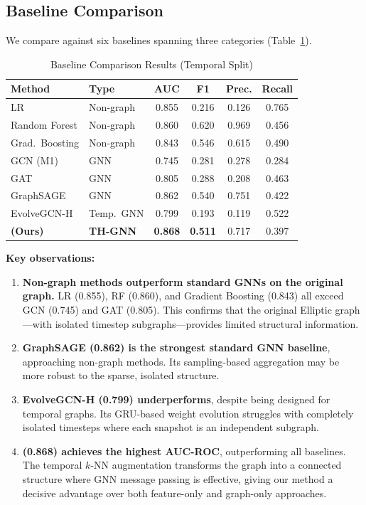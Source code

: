 \subsection{Baseline Comparison}

We compare against six baselines spanning three categories (Table~\ref{tab:baselines}).

\begin{table}[h]
\centering
\caption{Baseline Comparison Results (Temporal Split)}
\label{tab:baselines}
\begin{tabular}{llcccc}
\toprule
\textbf{Method} & \textbf{Type} & \textbf{AUC} & \textbf{F1} & \textbf{Prec.} & \textbf{Recall} \\
\midrule
LR & Non-graph & 0.855 & 0.216 & 0.126 & 0.765 \\
Random Forest & Non-graph & 0.860 & 0.620 & 0.969 & 0.456 \\
Grad.\ Boosting & Non-graph & 0.843 & 0.546 & 0.615 & 0.490 \\
\midrule
GCN (M1) & GNN & 0.745 & 0.281 & 0.278 & 0.284 \\
GAT & GNN & 0.805 & 0.288 & 0.208 & 0.463 \\
GraphSAGE & GNN & 0.862 & 0.540 & 0.751 & 0.422 \\
\midrule
EvolveGCN-H & Temp.\ GNN & 0.799 & 0.193 & 0.119 & 0.522 \\
\midrule
\textbf{\ours{} (Ours)} & \textbf{TH-GNN} & \textbf{0.868} & \textbf{0.511} & 0.717 & 0.397 \\
\bottomrule
\end{tabular}
\end{table}

\textbf{Key observations:}

\begin{enumerate}
    \item \textbf{Non-graph methods outperform standard GNNs on the original graph.} LR (0.855), RF (0.860), and Gradient Boosting (0.843) all exceed GCN (0.745) and GAT (0.805). This confirms that the original Elliptic graph---with isolated timestep subgraphs---provides limited structural information.

    \item \textbf{GraphSAGE (0.862) is the strongest standard GNN baseline}, approaching non-graph methods. Its sampling-based aggregation may be more robust to the sparse, isolated structure.

    \item \textbf{EvolveGCN-H (0.799) underperforms}, despite being designed for temporal graphs. Its GRU-based weight evolution struggles with completely isolated timesteps where each snapshot is an independent subgraph.

    \item \textbf{\ours{} (0.868) achieves the highest AUC-ROC}, outperforming all baselines. The temporal $k$-NN augmentation transforms the graph into a connected structure where GNN message passing is effective, giving our method a decisive advantage over both feature-only and graph-only approaches.
\end{enumerate}
